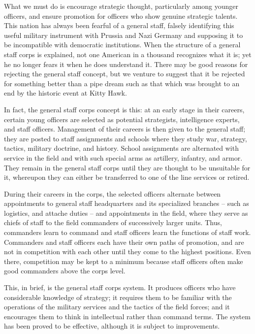 What we must do is encourage strategic thought, particularly among younger officers, and ensure promotion for officers who show genuine strategic talents. This nation has always been fearful of a general staff, falsely identifying this useful military instrument with Prussia and Nazi Germany and supposing it to be incompatible with democratic institutions. When the structure of a general staff corps is explained, not one American in a thousand recognizes what it is; yet he no longer fears it when he does understand it. There may be good reasons for rejecting the general staff concept, but we venture to suggest that it be rejected for something better than a pipe dream such as that which was brought to an end by the historic event at Kitty Hawk.

In fact, the general staff corps concept is this: at an early stage in their careers, certain young officers are selected as potential strategists, intelligence experts, and staff officers. Management of their careers is then given to the general staff; they are posted to staff assignments and schools where they study war, strategy, tactics, military doctrine, and history. School assignments are alternated with service in the field and with such special arms as artillery, infantry, and armor. They remain in the general staff corps until they are thought to be unsuitable for it, whereupon they can either be transferred to one of the line services or retired.

During their careers in the corps, the selected officers alternate between appointments to general staff headquarters and its specialized branches -- such as logistics, and attache duties -- and appointments in the field, where they serve as chiefs of staff to the field commanders of successively larger units. Thus, commanders learn to command and staff officers learn the functions of staff work. Commanders and staff officers each have their own paths of promotion, and are not in competition with each other until they come to the highest positions. Even there, competition may be kept to a minimum because staff officers often make good commanders above the corps level.

This, in brief, is the general staff corps system. It produces officers who have considerable knowledge of strategy; it requires them to be familiar with the operations of the military services and the tactics of the field forces; and it encourages them to think in intellectual rather than command terms. The system has been proved to be effective, although it is subject to improvements.

